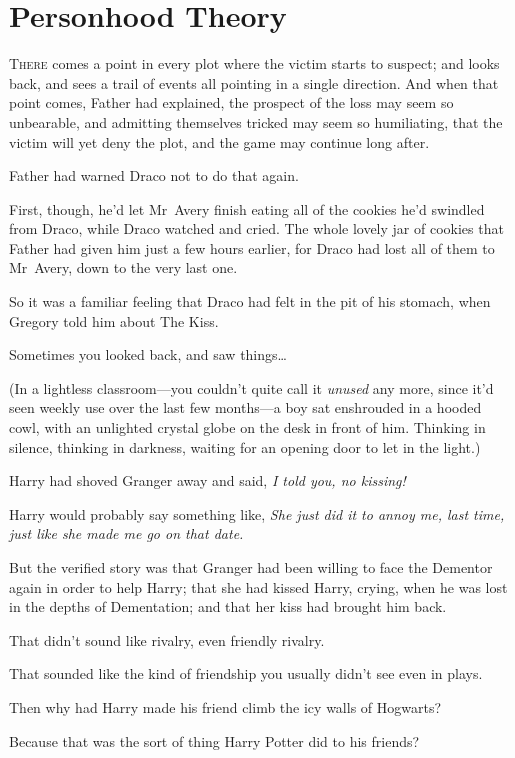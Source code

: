\chapter{Personhood Theory}

\lettrine{T}{here} comes a
point in every plot where the victim starts to suspect; and looks back, and
sees a trail of events all pointing in a single direction. And when that point
comes, Father had explained, the prospect of the loss may seem so unbearable,
and admitting themselves tricked may seem so humiliating, that the victim will
yet deny the plot, and the game may continue long after.

Father had warned Draco not to do that again.

First, though, he’d let Mr~Avery finish eating all of the cookies he’d
swindled from Draco, while Draco watched and cried. The whole lovely jar of
cookies that Father had given him just a few hours earlier, for Draco had lost
all of them to Mr~Avery, down to the very last one.

So it was a familiar feeling that Draco had felt in the pit of his stomach,
when Gregory told him about The Kiss.

Sometimes you looked back, and saw things…

(In a lightless classroom—you couldn’t quite call it \emph{unused} any more,
since it’d seen weekly use over the last few months—a boy sat enshrouded in a
hooded cowl, with an unlighted crystal globe on the desk in front of him.
Thinking in silence, thinking in darkness, waiting for an opening door to let
in the light.)

Harry had shoved Granger away and said, \emph{I told you, no kissing!}

Harry would probably say something like, \emph{She just did it to annoy me,
last time, just like she made me go on that date.}

But the verified story was that Granger had been willing to face the Dementor
again in order to help Harry; that she had kissed Harry, crying, when he was
lost in the depths of Dementation; and that her kiss had brought him back.

That didn’t sound like rivalry, even friendly rivalry.

That sounded like the kind of friendship you usually didn’t see even in plays.

Then why had Harry made his friend climb the icy walls of Hogwarts?

Because that was the sort of thing Harry Potter did to his friends?

